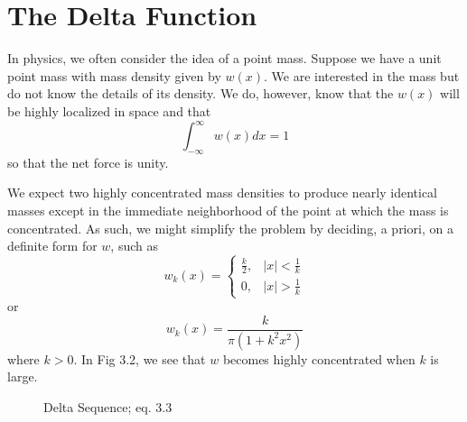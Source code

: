 \section{The Delta Function}
In physics, we often consider the idea of a point mass. Suppose we have a unit point mass with mass density given by \(w(x)\). We are interested in the mass but do not know the details of its density. We do, however, know that the \(w(x)\) will be highly localized in space and that 
\begin{equation}
    \int_{-\infty}^{\infty} w(x) dx = 1
\end{equation}
so that the net force is unity.

We expect two highly concentrated mass densities to produce nearly identical masses except in the immediate neighborhood of the point at which the mass is concentrated. As such, we might simplify the problem by deciding, a priori, on a definite form for \(w\), such as
\begin{equation}
    w_k(x) = \begin{cases}
        \frac{k}{2}, & |x|<\frac{1}{k}\\
        0, & |x|>\frac{1}{k}
    \end{cases}
\end{equation}
or
\begin{equation}
    w_k(x)=\frac{k}{\pi (1+k^2x^2)}
\end{equation}
where \(k>0\). In Fig 3.2, we see that \(w\) becomes highly concentrated when \(k\) is large.

\begin{figure}[H]
    \centering
    \caption{Delta Sequence;  eq. 3.3}
\end{figure}

